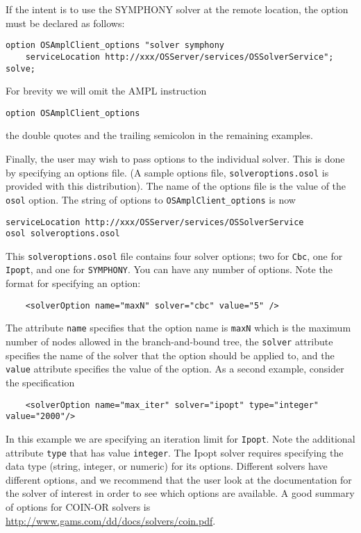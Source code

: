 If the intent is to use the SYMPHONY solver at the remote location, the option must be declared
as follows:

\begin{verbatim}
option OSAmplClient_options "solver symphony 
    serviceLocation http://xxx/OSServer/services/OSSolverService";
solve;
\end{verbatim}


For brevity we will omit the AMPL instruction
\begin{verbatim}
option OSAmplClient_options
\end{verbatim}
the double quotes and the trailing semicolon in the remaining examples.  

\medskip

Finally, the user may wish to pass options to the individual solver. This is done by specifying an options file.
(A sample options file, {\tt solveroptions.osol} is 
provided with this distribution).  The name of the options file is the value of the {\tt osol} option.
The string of options to {\tt OSAmplClient\_options} is now
\begin{verbatim}
serviceLocation http://xxx/OSServer/services/OSSolverService
osol solveroptions.osol
\end{verbatim}
This   {\tt solveroptions.osol}  file contains four solver options; two for {\tt Cbc}, one for {\tt Ipopt}, 
and one for {\tt SYMPHONY}.
You can have any number of options. Note the format for specifying an option:
\begin{verbatim}
    <solverOption name="maxN" solver="cbc" value="5" />
\end{verbatim}
The attribute {\tt name} specifies that the option name is {\tt maxN} which is the maximum number of nodes 
allowed in the branch-and-bound tree, the {\tt solver} attribute specifies the name of the solver that the 
option should be applied to, and the {\tt value} attribute specifies the value of the option. 
As a second example, consider the specification
\begin{verbatim}
    <solverOption name="max_iter" solver="ipopt" type="integer" value="2000"/> 
\end{verbatim}
In this example we are specifying an iteration limit for {\tt Ipopt}.  Note the additional attribute 
{\tt type} that has value  {\tt integer}. The Ipopt solver requires specifying the data type 
(string, integer, or numeric) for its options.   Different solvers have different options, 
and we recommend that the user look at the documentation for the solver of interest in order to see 
which options are available.  
A good summary of options for COIN-OR solvers is 
\url{http://www.gams.com/dd/docs/solvers/coin.pdf}.

